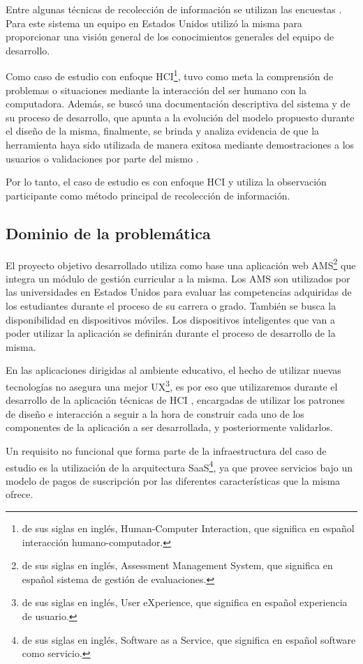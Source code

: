 Entre algunas técnicas de recolección de información se utilizan las encuestas \citep{robson_real_2011}. Para este sistema un equipo en Estados Unidos utilizó la misma para proporcionar una visión general de los conocimientos generales del equipo de desarrollo.

Como caso de estudio con enfoque HCI\footnote{de sus siglas en inglés, Human-Computer Interaction, que significa en español interacción humano-computador.}, tuvo como meta la comprensión de problemas o situaciones mediante la interacción del ser humano con la computadora. Además, se buscó una documentación descriptiva del sistema y de su proceso de desarrollo, que apunta a la evolución del modelo propuesto durante el diseño de la misma, finalmente, se brinda y analiza evidencia de que la herramienta haya sido utilizada de manera exitosa mediante demostraciones a los usuarios o validaciones por parte del mismo \citep{lazar_research_2010}. 

Por lo tanto, el caso de estudio es con enfoque HCI y utiliza la observación participante como método principal de recolección de información.

\subsection{Dominio de la problemática}
El proyecto objetivo desarrollado utiliza como base una aplicación web AMS\footnote{de sus siglas en inglés, Assessment Management System, que significa en español sistema de gestión de evaluaciones.} que integra un módulo de gestión curricular a la misma. Los AMS son utilizados por las universidades en Estados Unidos para evaluar las competencias adquiridas de los estudiantes durante el proceso de su carrera o grado. También se busca la disponibilidad en dispositivos móviles. Los dispositivos inteligentes que van a poder utilizar la aplicación se definirán durante el proceso de desarrollo de la misma.

En las aplicaciones dirigidas al ambiente educativo, el hecho de utilizar nuevas tecnologías no asegura una mejor UX\footnote{de sus siglas en inglés, User eXperience, que significa en español experiencia de usuario.}, es por eso que utilizaremos durante el desarrollo de la aplicación técnicas de HCI \citep{lazar_research_2010}, encargadas de utilizar los patrones de diseño e interacción a seguir a la hora de construir cada uno de los componentes de la aplicación a ser desarrollada, y posteriormente validarlos.

Un requisito no funcional que forma parte de la infraestructura del caso de estudio es la utilización de la arquitectura SaaS\footnote{de sus siglas en inglés, Software as a Service, que significa en español software como servicio.}, ya que provee servicios bajo un modelo de pagos de suscripción por las diferentes características que la misma ofrece.

